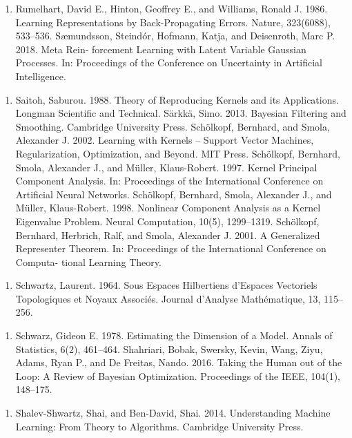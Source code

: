 \begin{enumerate}
\item Rumelhart, David E., Hinton, Geoffrey E., and Williams, Ronald J. 1986. Learning Representations by Back-Propagating Errors. Nature, 323(6088), 533–536. Sæmundsson, Steindór, Hofmann, Katja, and Deisenroth, Marc P. 2018. Meta Rein- forcement Learning with Latent Variable Gaussian Processes. In: Proceedings of the Conference on Uncertainty in Artiﬁcial Intelligence.
\end{enumerate}

\begin{enumerate}
\item Saitoh, Saburou. 1988. Theory of Reproducing Kernels and its Applications. Longman Scientiﬁc and Technical. Särkkä, Simo. 2013. Bayesian Filtering and Smoothing. Cambridge University Press. Schölkopf, Bernhard, and Smola, Alexander J. 2002. Learning with Kernels – Support Vector Machines, Regularization, Optimization, and Beyond. MIT Press. Schölkopf, Bernhard, Smola, Alexander J., and Müller, Klaus-Robert. 1997. Kernel Principal Component Analysis. In: Proceedings of the International Conference on Artiﬁcial Neural Networks. Schölkopf, Bernhard, Smola, Alexander J., and Müller, Klaus-Robert. 1998. Nonlinear Component Analysis as a Kernel Eigenvalue Problem. Neural Computation, 10(5), 1299–1319. Schölkopf, Bernhard, Herbrich, Ralf, and Smola, Alexander J. 2001. A Generalized Representer Theorem. In: Proceedings of the International Conference on Computa- tional Learning Theory.
\end{enumerate}

\begin{enumerate}
\item Schwartz, Laurent. 1964. Sous Espaces Hilbertiens d’Espaces Vectoriels Topologiques et Noyaux Associés. Journal d’Analyse Mathématique, 13, 115–256.
\end{enumerate}

\begin{enumerate}
\item Schwarz, Gideon E. 1978. Estimating the Dimension of a Model. Annals of Statistics, 6(2), 461–464. Shahriari, Bobak, Swersky, Kevin, Wang, Ziyu, Adams, Ryan P., and De Freitas, Nando. 2016. Taking the Human out of the Loop: A Review of Bayesian Optimization. Proceedings of the IEEE, 104(1), 148–175.
\end{enumerate}

\begin{enumerate}
\item Shalev-Shwartz, Shai, and Ben-David, Shai. 2014. Understanding Machine Learning: From Theory to Algorithms. Cambridge University Press.
\end{enumerate}

